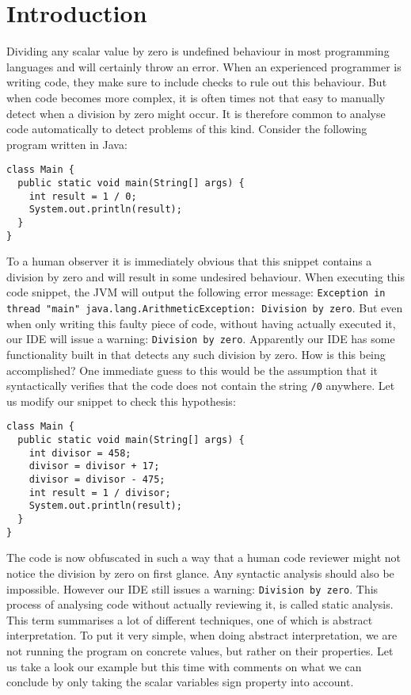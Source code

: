 \chapter{Introduction}


%
%


Dividing any scalar value by zero is undefined behaviour in most programming languages and will certainly throw an error. When an experienced programmer is writing code, they make sure to include checks to rule out this behaviour. But when code becomes more complex, it is often times not that easy to manually detect when a division by zero might occur. It is therefore common to analyse code automatically to detect problems of this kind. Consider the following program written in Java:


\begin{center}
\begin{BVerbatim}
class Main {
  public static void main(String[] args) {
    int result = 1 / 0;
    System.out.println(result);
  }
}
\end{BVerbatim}
\end{center}

\noindent To a human observer it is immediately obvious that this snippet contains a division by zero and will result in some undesired behaviour. When executing this code snippet, the JVM will output the following error message: \texttt{Exception in thread "main" java.lang.ArithmeticException: Division by zero}. But even when only writing this faulty piece of code, without having actually executed it, our IDE will issue a warning: \texttt{Division by zero}. Apparently our IDE has some functionality built in that detects any such division by zero. How is this being accomplished? One immediate guess to this would be the assumption that it syntactically verifies that the code does not contain the string \texttt{/0} anywhere. Let us modify our snippet to check this hypothesis:

 \begin{center}
\begin{BVerbatim}
class Main {
  public static void main(String[] args) {
    int divisor = 458;
    divisor = divisor + 17;
    divisor = divisor - 475;
    int result = 1 / divisor;
    System.out.println(result);
  }
}
\end{BVerbatim}
\end{center}

\noindent The code is now obfuscated in such a way that a human code reviewer might not notice the division by zero on first glance. Any syntactic analysis should also be impossible. However our IDE still issues a warning: \texttt{Division by zero}. This process of analysing code without actually reviewing it, is called static analysis. This term summarises a lot of different techniques, one of which is abstract interpretation.
To put it very simple, when doing abstract interpretation, we are not running the program on concrete values, but rather on their properties. Let us take a look our example but this time with comments on what we can conclude by only taking the scalar variables sign property into account.  


